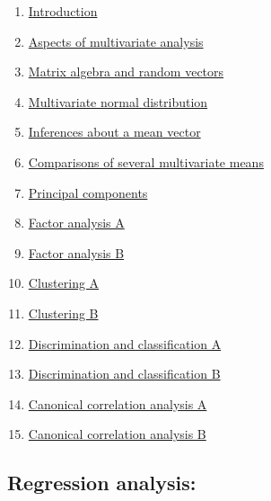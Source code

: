 \documentclass[11pt]{article}
\begin{document}
\begin{multicols}{2}
	\begin{enumerate}
		\item \href{https://mp.weixin.qq.com/s/pZIbmouXx9ZBQKIeBDKB8Q}{Introduction}	%
		\item \href{https://mp.weixin.qq.com/s/__1o874PejDcCaoBzgespA}{Aspects of multivariate analysis}	%
		\item \href{https://mp.weixin.qq.com/s/P-ZZzjS-NY11rdD7eZam5A}{Matrix algebra and random vectors}	%
		\item \href{https://mp.weixin.qq.com/s/uslTYHAAVhd4pTwTQrFCXA}{Multivariate normal distribution}	%
		\item \href{https://mp.weixin.qq.com/s/nTTG5rQs1IzRoRZPRYoK1g}{Inferences about a mean vector}	%
		\item \href{https://mp.weixin.qq.com/s/2pVYL1l6u_eyKv_PJQMprw}{Comparisons of several multivariate means}	%
		\item \href{https://mp.weixin.qq.com/s/y8nPVrtwchngUg0WW5EIAQ}{Principal components}	%
		\item \href{https://mp.weixin.qq.com/s/KEfVaRwGfEcOBzh-cyIQsw}{Factor analysis A}	%
		\item \href{https://mp.weixin.qq.com/s/H08dZjICYFko6uK0vAracA}{Factor analysis B}	%
		\item \href{https://mp.weixin.qq.com/s/wJOidZJXng59WnwSFf5hOw}{Clustering A}	%
		\item \href{https://mp.weixin.qq.com/s/xe8J0WUMSkqpd6zFp6X-Rg}{Clustering B}	%
		\item \href{https://mp.weixin.qq.com/s/bt9aDGQDduV5HEVYxg9yTQ}{Discrimination and classification A}	%
		\item \href{https://mp.weixin.qq.com/s/HHgn1n3oQPJh_APWYCqjpA}{Discrimination and classification B}	%
		\item \href{https://mp.weixin.qq.com/s/6RHTpyK3NYjparH8CvebEg}{Canonical correlation analysis A}	%
		\item \href{https://mp.weixin.qq.com/s/RJ9OD1dOo4kw7j2Pz3EnwA}{Canonical correlation analysis B}	%
	\end{enumerate}
\end{multicols}


\subsection*{\small Regression analysis:}
\end{document}
